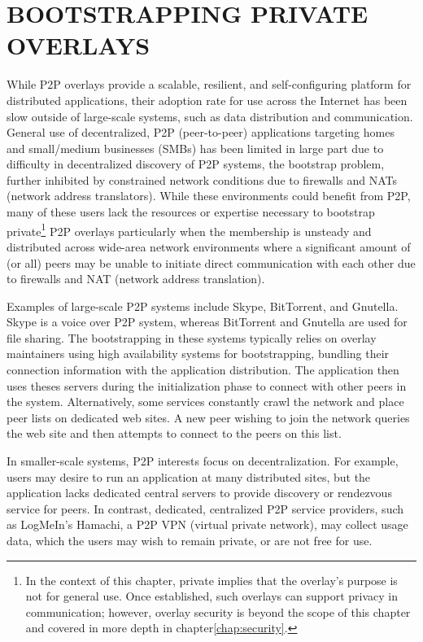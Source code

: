 \chapter{BOOTSTRAPPING PRIVATE OVERLAYS}
\label{chap:bootstrapping}

While P2P overlays provide a scalable, resilient, and self-configuring platform
for distributed applications, their adoption rate for use across the Internet
has been slow outside of large-scale systems, such as data distribution and
communication.  General use of decentralized, P2P (peer-to-peer) applications
targeting homes and small/medium businesses (SMBs) has been limited in large
part due to difficulty in decentralized discovery of P2P systems, the bootstrap
problem, further inhibited by constrained network conditions due to firewalls
and NATs (network address translators).  While these environments could benefit
from P2P, many of these users lack the resources or expertise necessary to
bootstrap private\footnote{In the context of this chapter, private implies that
the overlay's purpose is not for general use. Once established, such overlays
can support privacy in communication; however, overlay security is beyond the
scope of this chapter and covered in more depth in chapter\ref{chap:security}.}
P2P overlays particularly when the membership is unsteady and distributed
across wide-area network environments where a significant amount of (or all)
peers may be unable to initiate direct communication with each other due to
firewalls and NAT (network address translation).

Examples of large-scale P2P systems include Skype, BitTorrent, and Gnutella.
Skype is a voice over P2P system, whereas BitTorrent and Gnutella are used for
file sharing.  The bootstrapping in these systems typically relies on overlay
maintainers using high availability systems for bootstrapping, bundling their
connection information with the application distribution.  The application then
uses theses servers during the initialization phase to connect with other peers
in the system.  Alternatively, some services constantly crawl the network and
place peer lists on dedicated web sites. A new peer wishing to join the network
queries the web site and then attempts to connect to the peers on this list.

In smaller-scale systems, P2P interests focus on decentralization.  For
example, users may desire to run an application at many distributed sites, but
the application lacks dedicated central servers to provide discovery or
rendezvous service for peers.  In contrast, dedicated, centralized P2P service
providers, such as LogMeIn's Hamachi, a P2P VPN (virtual private network), may
collect usage data, which the users may wish to remain private, or are not free
for use.

